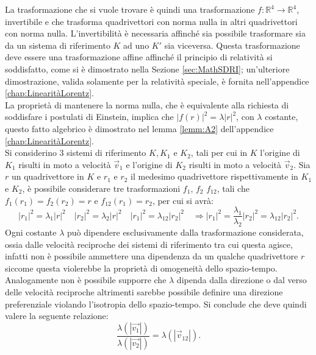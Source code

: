La trasformazione che si vuole trovare è quindi una trasformazione $f:\mathbb{R}^4\rightarrow\mathbb{R}^4$, invertibile e che trasforma quadrivettori con norma nulla in altri quadrivettori con norma nulla. L'invertibilità è necessaria affinché sia possibile trasformare sia da un sistema di riferimento $K$ ad uno $K'$ sia viceversa. Questa trasformazione deve essere una trasformazione affine affinché il principio di relatività si soddisfatto, come si è dimostrato nella Sezione \ref{sec:MathSDRI}; un'ulteriore dimostrazione, valida solamente per la relatività speciale, è fornita nell'appendice \ref{chap:LinearitàLorentz}.\\
La proprietà di mantenere la norma nulla, che è equivalente alla richiesta di soddisfare i postulati di Einstein, implica che  $|f(r)|^2=\lambda |r|^2$, con $\lambda$ costante, questo fatto algebrico è dimostrato nel lemma \ref{lemm:A2} dell'appendice \ref{chap:LinearitàLorentz}.\\ Si considerino $3$ sistemi di riferimento $ K, K_1$ e $K_2$, tali per cui in $K$ l'origine di $K_1$ risulti in moto a velocità $\vec{v}_1$ e l'origine di $K_2$ risulti in moto a velocità $\vec{v}_2$. Sia $r$ un quadrivettore in $K$ e $r_1$ e $r_2$ il medesimo quadrivettore rispettivamente in $K_1$ e $K_2$, è possibile considerare tre trasformazioni $f_1$, $f_2$ $f_{12}$, tali che $f_1(r_1)=f_2(r_2)=r$ e $f_{12}(r_1)=r_2$, per cui si avrà:
\begin{equation*}
    |r_1|^2=\lambda_1 |r|^2 \quad |r_2|^2=\lambda_2 |r|^2 \quad |r_1|^2=\lambda_{12} |r_2|^2 \quad  \Rightarrow |r_1|^2=\frac{\lambda_1}{\lambda_2}|r_2|^2=\lambda_{12}|r_2|^2.
\end{equation*}
Ogni costante $\lambda$ può dipendere esclusivamente dalla trasformazione considerata, ossia dalle velocità reciproche dei sistemi di riferimento tra cui questa agisce, infatti non è possibile ammettere una dipendenza da un qualche quadrivettore $r$ siccome questa violerebbe la proprietà di omogeneità dello spazio-tempo. Analogamente non è possibile supporre che $\lambda$ dipenda dalla direzione o dal verso delle velocità reciproche altrimenti sarebbe possibile definire una direzione preferenziale violando l'isotropia dello spazio-tempo. Si conclude che deve quindi valere la seguente relazione:
\begin{equation}
    \frac{\lambda(|\vec{v_1}|)}{\lambda(|\vec{v_2}|)}=\lambda(|\vec{v}_{12}|).
    \label{fraclambda}
\end{equation} 
